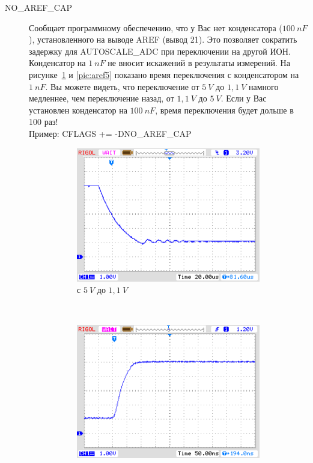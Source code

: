 \begin{description}
  \item[NO\_AREF\_CAP] Сообщает программному обеспечению, что у Вас нет конденсатора (\(100~nF\)), установленного 
на выводе AREF (вывод 21). Это позволяет сократить задержку для AUTOSCALE\_ADC при переключении на другой ИОН. 
Конденсатор на \(1~nF\) не вносит искажений в результаты измерений. На рисунке~\ref{pic:aref1} и \ref{pic:aref5} 
показано время переключения  с конденсатором на \(1~nF\).
Вы можете видеть, что переключение от \(5~V\) до \(1,1~V\) намного медленнее, чем переключение назад, от \(1,1~V\) 
до \(5~V\). 
Если у Вас установлен конденсатор на \(100~nF\), время переключения будет дольше в 100 раз!\\
Пример: CFLAGS += -DNO\_AREF\_CAP

\begin{figure}[H]
  \begin{subfigure}[b]{.5\textwidth}
    \centering
    \includegraphics[width=.95\textwidth]{../PNG/AREF2_1V.png}
    \caption{с \(5~V\) до \(1,1~V\)}
    \label{pic:aref1}
  \end{subfigure}
  ~
  \begin{subfigure}[b]{.5\textwidth}
    \centering
    \includegraphics[width=.95\textwidth]{../PNG/AREF2VCC.png}

\end{subfigure}
\end{figure}
\end{description}
